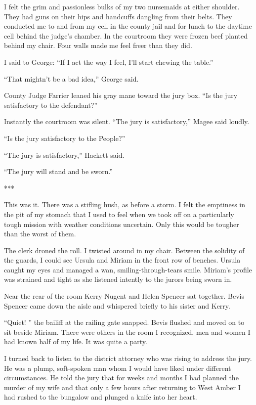\documentclass{novel}
\begin{document}
I felt the grim and passionless bulks of my two nursemaids at either shoulder. They had guns on their hips and handcuffs dangling from their belts. They conducted me to and from my cell in the county jail and for lunch to the daytime cell behind the judge’s chamber. In the courtroom they were frozen beef planted behind my chair. Four walls made me feel freer than they did.

I said to George: “If I act the way I feel, I’ll start chewing the table.”

“That mightn’t be a bad idea,” George said.

County Judge Farrier leaned his gray mane toward the jury box. “Is the jury satisfactory to the defendant?”

Instantly the courtroom was silent. “The jury is satisfactory,” Magee said loudly.

“Is the jury satisfactory to the People?”

“The jury is satisfactory,” Hackett said.

“The jury will stand and be sworn.”

***

This was it. There was a stifling hush, as before a storm. I felt the emptiness in the pit of my stomach that I used to feel when we took off on a particularly tough mission with weather conditions uncertain. Only this would be tougher than the worst of them.

The clerk droned the roll. I twisted around in my chair. Between the solidity of the guards, I could see Ursula and Miriam in the front row of benches. Ursula caught my eyes and managed a wan, smiling-through-tears smile. Miriam’s profile was strained and tight as she listened intently to the jurors being sworn in.

Near the rear of the room Kerry Nugent and Helen Spencer sat together. Bevis Spencer came down the aisle and whispered briefly to his sister and Kerry.

“Quiet! ” the bailiff at the railing gate snapped. Bevis flushed and moved on to sit beside Miriam. There were others in the room I recognized, men and women I had known half of my life. It was quite a party.

I turned back to listen to the district attorney who was rising to address the jury. He was a plump, soft-spoken man whom I would have liked under different circumstances. He told the jury that for weeks and months I had planned the murder of my wife and that only a few hours after returning to West Amber I had rushed to the bungalow and plunged a knife into her heart.
\end{document}
